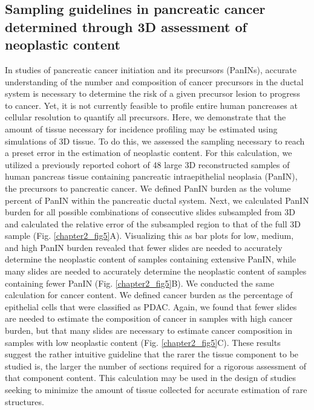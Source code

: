 \begin{refsection}
    \subsection{Sampling guidelines in pancreatic cancer determined through 3D assessment of neoplastic content}
    In studies of pancreatic cancer initiation and its precursors (PanINs), accurate understanding of the number and composition of cancer precursors in the ductal system is necessary to determine the risk of a given precursor lesion to progress to cancer\cite{Distler2014Precursor,Lennon2014Early,McGuigan2018Pancreatic}. Yet, it is not currently feasible to profile entire human pancreases at cellular resolution to quantify all precursors. Here, we demonstrate that the amount of tissue necessary for incidence profiling may be estimated using simulations of 3D tissue. To do this, we assessed the sampling necessary to reach a preset error in the estimation of neoplastic content. 
    For this calculation, we utilized a previously reported cohort of 48 large 3D reconstructed samples of human pancreas tissue containing pancreatic intraepithelial neoplasia (PanIN), the precursors to pancreatic cancer\cite{Braxton20243D}. We defined PanIN burden as the volume percent of PanIN within the pancreatic ductal system. Next, we calculated PanIN burden for all possible combinations of consecutive slides subsampled from 3D and calculated the relative error of the subsampled region to that of the full 3D sample (Fig. \ref{chapter2_fig5}A). Visualizing this as bar plots for low, medium, and high PanIN burden revealed that fewer slides are needed to accurately determine the neoplastic content of samples containing extensive PanIN, while many slides are needed to accurately determine the neoplastic content of samples containing fewer PanIN (Fig. \ref{chapter2_fig5}B). 
    We conducted the same calculation for cancer content. We defined cancer burden as the percentage of epithelial cells that were classified as PDAC. Again, we found that fewer slides are needed to estimate the composition of cancer in samples with high cancer burden, but that many slides are necessary to estimate cancer composition in samples with low neoplastic content (Fig. \ref{chapter2_fig5}C). 
    These results suggest the rather intuitive guideline that the rarer the tissue component to be studied is, the larger the number of sections required for a rigorous assessment of that component content. This calculation may be used in the design of studies seeking to minimize the amount of tissue collected for accurate estimation of rare structures. 
    

\end{refsection}
